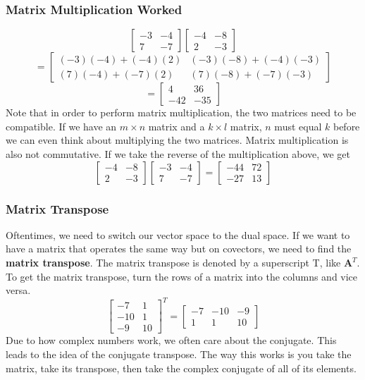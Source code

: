 \documentclass[10pt]{beamer}
\begin{document}
\begin{frame}
  \frametitle{Matrix Multiplication Worked}
  $$\left[\begin{matrix}
      -3 & -4\\
      7 & -7
    \end{matrix}\right] \left[\begin{matrix}
      -4 & -8\\
      2 & -3
    \end{matrix}\right]$$
  $$= \left[\begin{matrix}
      (-3)(-4) + (-4)(2) & (-3)(-8) + (-4)(-3)\\
      (7)(-4) + (-7)(2) & (7)(-8) + (-7)(-3)
    \end{matrix}\right]$$
  $$= \left[\begin{matrix}
      4 & 36\\
      -42 & -35
    \end{matrix}\right]$$
  Note that in order to perform matrix multiplication, the two matrices need to be compatible. If we have an $m \times n$ matrix and a $k \times l$ matrix, $n$ must equal $k$ before we can even think about multiplying the two matrices. Matrix multiplication is also not commutative. If we take the reverse of the multiplication above, we get
  $$\left[\begin{matrix}
      -4 & -8\\
      2 & -3
    \end{matrix}\right] \left[\begin{matrix}
      -3 & -4\\
      7 & -7
    \end{matrix}\right] = \left[\begin{matrix}
      -44 & 72\\
      -27 & 13\end{matrix}\right]$$
\end{frame}

\begin{frame}
  \frametitle{Matrix Transpose}
  Oftentimes, we need to switch our vector space to the dual space. If we want to have a matrix that operates the same way but on covectors, we need to find the \textbf{matrix transpose}. The matrix transpose is denoted by a superscript T, like $\mathbf{A}^T$. To get the matrix transpose, turn the rows of a matrix into the columns and vice versa.
  $$\left[\begin{matrix}
      -7 & 1\\
      -10 & 1\\
      -9 & 10
    \end{matrix}\right]^T = \left[\begin{matrix}
      -7 & -10 & -9\\
      1 & 1 & 10
    \end{matrix}\right]$$
  Due to how complex numbers work, we often care about the conjugate. This leads to the idea of the conjugate transpose. The way this works is you take the matrix, take its transpose, then take the complex conjugate of all of its elements.
\end{frame}
\end{document}
